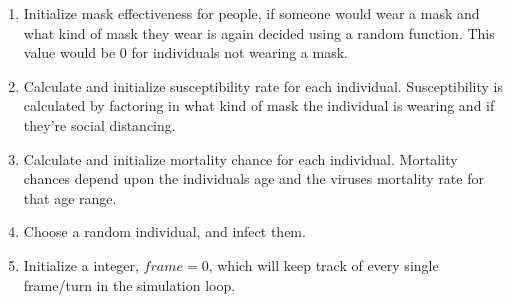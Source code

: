 \documentclass[11pt]{article}
\begin{document}
\begin{enumerate}[label=\textbf{\arabic*})]
\begin{enumerate}
        \item Initialize mask effectiveness for people, if someone would wear a mask and what kind of mask they wear is again decided using a random function. This value would be 0 for individuals not wearing a mask.
        \item Calculate and initialize susceptibility rate for each individual. Susceptibility is calculated by factoring in what kind of mask the individual is wearing and if they're social distancing.
        \item Calculate and initialize mortality chance for each individual. Mortality chances depend upon the individuals age and the viruses mortality rate for that age range.
        \item Choose a random individual, and infect them.
        \item Initialize a integer, $frame = 0$, which will keep track of every single frame/turn in the simulation loop.
    \end{enumerate}
\end{enumerate}
\end{document}
